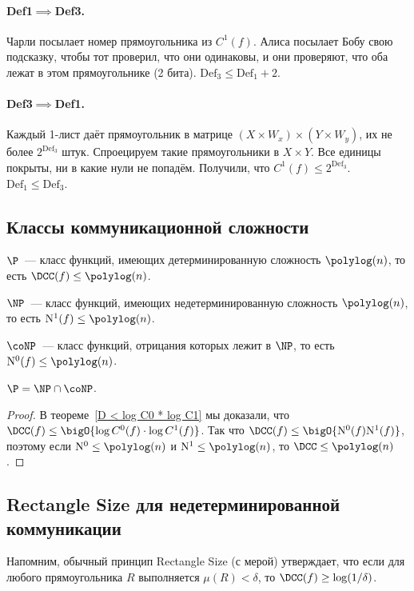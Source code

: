\paragraph{Def1$\implies$Def3.}
Чарли посылает номер прямоугольника из $C^1(f)$. Алиса посылает Бобу свою подсказку, чтобы тот проверил,
что они одинаковы, и они проверяют, что оба лежат в этом прямоугольнике (2 бита).
$\mathrm{Def}_3 \le \mathrm{Def}_1 + 2$.

\paragraph{Def3$\implies$Def1.}
Каждый 1-лист даёт прямоугольник в матрице $(X \times W_x) \times (Y \times W_y)$, их не более
$2^{\mathrm{Def}_3}$ штук. Спроецируем такие прямоугольники в $X \times Y$. Все единицы покрыты, ни в
какие нули не попадём. Получили, что $C^1(f) \le 2^{\mathrm{Def}_3}$. $\mathrm{Def}_1\le
\mathrm{Def}_3$.

\subsection{Классы коммуникационной сложности}

\begin{definition}
    $\P$~--- класс функций, имеющих детерминированную сложность $\polylog(n)$, то есть $\DCC(f) \le
    \polylog(n)$.

    $\NP$~--- класс функций, имеющих недетерминированную сложность $\polylog(n)$, то есть $\NCC{1}(f) \le
    \polylog(n)$.

    $\coNP$~--- класс функций, отрицания которых лежит в $\NP$, то есть $\NCC{0}(f) \le \polylog(n)$.
\end{definition}

\begin{remark}
    $\P = \NP \cap \coNP$.
\end{remark}

\begin{proof}
    В теореме~\ref{D < log C0 * log C1} мы доказали, что $\DCC(f) \le
    \bigO{\log C^0(f) \cdot \log C^1(f)}$. Так что $\DCC(f) \le \bigO{\NCC{0}(f) \NCC{1}(f)}$, поэтому
    если $\NCC{0} \le \polylog(n)$ и $\NCC{1} \le \polylog(n)$, то $\DCC \le \polylog(n)$. 
\end{proof}

\subsection{Rectangle Size для недетерминированной коммуникации}
Напомним, обычный принцип Rectangle Size (с мерой) утверждает, что если для любого прямоугольника $R$
выполняется $\mu(R) < \delta$, то $\DCC(f) \ge \log(1 / \delta)$. 


